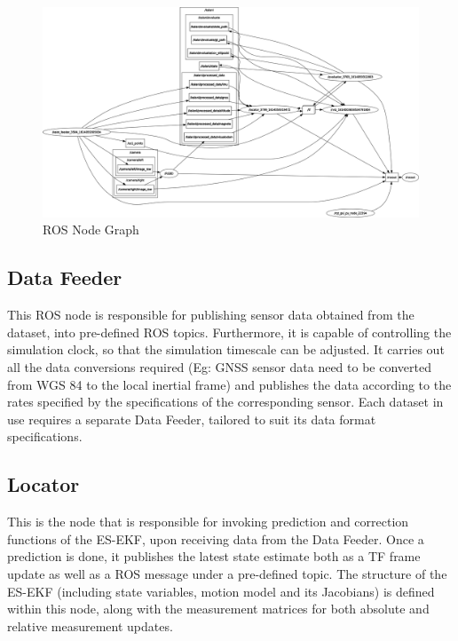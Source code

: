 \begin{figure}[h]
	\begin{center}
	\includegraphics[width=\textwidth]{figs/rosgraph.png}
	\end{center}
	\vspace{-0.5cm}
	\caption[\gls{ROS} Node Graph]{\gls{ROS} Node Graph}
	\label{fig:pa:nodeGraph}
	\vspace{0.5cm}
\end{figure}

\subsection{Data Feeder}
This \gls{ROS} node is responsible for publishing sensor data obtained from the dataset, into pre-defined \gls{ROS} topics. Furthermore, it is capable of controlling the simulation clock, so that the simulation timescale can be adjusted. It carries out all the data conversions required (Eg: \gls{GNSS} sensor data need to be converted from \gls{WGS} 84 to the local inertial frame) and publishes the data according to the rates specified by the specifications of the corresponding sensor. Each dataset in use requires a separate Data Feeder, tailored to suit its data format specifications.

\subsection{Locator}
This is the node that is responsible for invoking prediction and correction functions of the \gls{ES-EKF}, upon receiving data from the Data Feeder. Once a prediction is done, it publishes the latest state estimate both as a TF frame update as well as a \gls{ROS} message under a pre-defined topic. The structure of the \gls{ES-EKF} (including state variables, motion model and its Jacobians) is defined within this node, along with the measurement matrices for both absolute and relative measurement updates.

